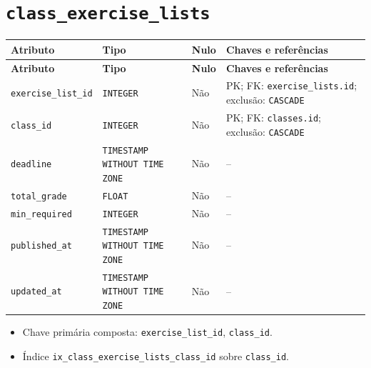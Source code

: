 \section*{\texttt{class\_\allowbreak{}exercise\_\allowbreak{}lists}}
\begingroup\footnotesize
\setlength{\tabcolsep}{4pt}\renewcommand{\arraystretch}{1.15}
\begin{longtable}{|>{\raggedright\arraybackslash}p{}|>{\raggedright\arraybackslash}p{}|>{\raggedright\arraybackslash}p{}|>{\raggedright\arraybackslash}p{}|}
\hline
\textbf{Atributo} & \textbf{Tipo} & \textbf{Nulo} & \textbf{Chaves e referências} \\ \hline
\endfirsthead
\hline \textbf{Atributo} & \textbf{Tipo} & \textbf{Nulo} & \textbf{Chaves e referências} \\ \hline
\endhead
\texttt{exercise\_\allowbreak{}list\_\allowbreak{}id} & \texttt{INTEGER} & Não & PK; FK: \texttt{exercise\_\allowbreak{}lists.id}; exclusão: \texttt{CASCADE} \\ \hline
\texttt{class\_\allowbreak{}id} & \texttt{INTEGER} & Não & PK; FK: \texttt{classes.id}; exclusão: \texttt{CASCADE} \\ \hline
\texttt{deadline} & \texttt{TIMESTAMP WITHOUT TIME ZONE} & Não & -- \\ \hline
\texttt{total\_\allowbreak{}grade} & \texttt{FLOAT} & Não & -- \\ \hline
\texttt{min\_\allowbreak{}required} & \texttt{INTEGER} & Não & -- \\ \hline
\texttt{published\_\allowbreak{}at} & \texttt{TIMESTAMP WITHOUT TIME ZONE} & Não & -- \\ \hline
\texttt{updated\_\allowbreak{}at} & \texttt{TIMESTAMP WITHOUT TIME ZONE} & Não & -- \\ \hline
\end{longtable}
\begin{itemize}
\item Chave primária composta: \texttt{exercise\_\allowbreak{}list\_\allowbreak{}id}, \texttt{class\_\allowbreak{}id}.
\item Índice \texttt{ix\_\allowbreak{}class\_\allowbreak{}exercise\_\allowbreak{}lists\_\allowbreak{}class\_\allowbreak{}id} sobre \texttt{class\_\allowbreak{}id}.
\end{itemize}
\endgroup

